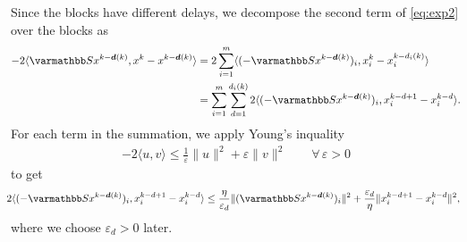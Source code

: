 \documentclass[10pt,mathserif]{beamer}
\begin{document}
\begin{frame}
Since the blocks have different delays, we decompose the second term of \eqref{eq:exp2} over the blocks as
\begin{align*}
  - 2\langle \opS  x^{k-\vecdelay(k)} ,x^k-{x}^{k-\vecdelay(k)}\rangle 
  & = 2\sum_{i=1}^{m}\langle (-\opS  x^{k-\vecdelay(k)})_i,x^k_i-{x}_i^{k-d_i(k)} \rangle\\
  & = \sum_{i=1}^{m}\sum_{d=1}^{d_i(k)}2\langle (-\opS  x^{k-\vecdelay(k)})_i,{x}_i^{k-d+1}-{x}_i^{k-d}\rangle.
\end{align*}
For each term in the summation, we apply Young's inquality
\begin{align*}
  -2\langle u,v\rangle \le \frac{1}{\varepsilon}\|u\|^2 + \varepsilon\|v\|^2\qquad\forall\, \varepsilon>0
\end{align*}
to get
\begin{align*}
\!\!\!
2\langle (-\opS  x^{k-\vecdelay(k)})_i,{x}_i^{k-d+1}-{x}_i^{k-d}\rangle
 \le \frac{\eta}{\varepsilon_d} \|(\opS  x^{k-\vecdelay(k)})_i\|^2 + \frac{\varepsilon_d}{\eta}\|{x}_i^{k-d+1}-{x}_i^{k-d}\|^2,
\end{align*}
where we choose $\varepsilon_d>0$ later.

\end{frame}
\end{document}
